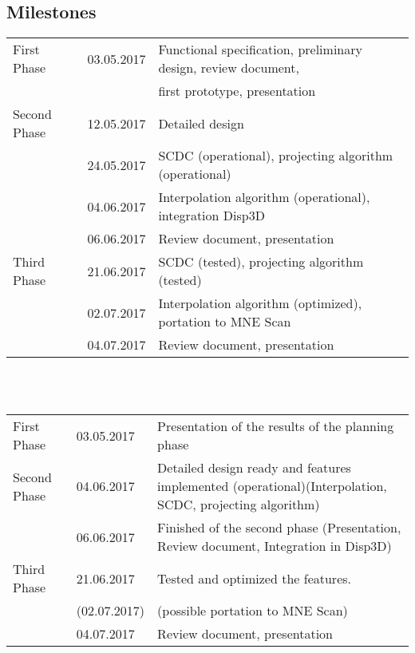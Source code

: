 \subsection{Milestones}
\begin{tabular}{lll}
    First Phase & 03.05.2017 & Functional specification, preliminary design, review document,\\
			    &			 & first prototype, presentation \\
    Second Phase & 12.05.2017 & Detailed design\\
                 & 24.05.2017 & SCDC (operational), projecting algorithm (operational)\\
                 & 04.06.2017 & Interpolation algorithm (operational), integration Disp3D\\
                 & 06.06.2017 & Review document, presentation\\
    Third Phase & 21.06.2017 & SCDC (tested), projecting algorithm (tested) \\          
                & 02.07.2017 & Interpolation algorithm (optimized), portation to MNE Scan\\
                & 04.07.2017 & Review document, presentation \\
\end{tabular}
\\\\
\begin{tabular}{lll}
	First Phase & 03.05.2017 & Presentation of the results of the planning phase\\
	Second Phase & 04.06.2017 & Detailed design ready and features implemented (operational)(Interpolation, SCDC, projecting algorithm)\\
				& 06.06.2017 & Finished of the second phase (Presentation, Review document, Integration in Disp3D)\\
	Third Phase & 21.06.2017 & Tested and optimized the features. \\          
				&(02.07.2017)&(possible portation to MNE Scan)\\
				& 04.07.2017 & Review document, presentation \\
\end{tabular}

